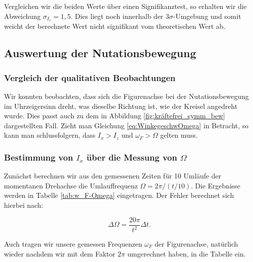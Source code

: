 \documentclass{article}
\begin{document}
Vergleichen wir die beiden Werte über einen Signifikanztest, so erhalten wir die Abweichung $\sigma_{I_z} = 1,5$. Dies liegt noch innerhalb der $3\sigma$-Umgebung und somit weicht der berechnete Wert nicht signifikant vom theoretischen Wert ab.


\newpage

\subsection{Auswertung der Nutationsbewegung}

\subsubsection{Vergleich der qualitativen Beobachtungen}

Wir konnten beobachten, dass sich die Figurenachse bei der Nutationsbewegung im Uhrzeigersinn dreht, was dieselbe Richtung ist, wie der Kreisel angedreht wurde. Dies passt auch zu dem in Abbildung \ref{fig:kräftefrei_symm_bew} dargestellten Fall. Zieht man Gleichung \ref{eq:WinkegeschwOmega} in Betracht, so kann man schlussfolgern, dass $I_x > I_z$ und $\omega_F > \Omega$ gelten muss.

\subsubsection{Bestimmung von $I_x$ über die Messung von $\Omega$}

Zunächst berechnen wir aus den gemessenen Zeiten für 10 Umläufe der momentanen Drehachse die Umlauffrequenz $\Omega = 2 \pi / (t/10)$. Die Ergebnisse werden in Tabelle \ref{tab:w_F-Omega} eingetragen. Der Fehler berechnet sich hierbei nach:

\begin{equation}
    \Delta \Omega = \frac{20 \pi}{t^2} \Delta t. 
\end{equation}

Auch tragen wir unsere gemessen Frequenzen $\omega_F$ der Figurenachse, natürlich wieder nachdem wir mit dem Faktor $2 \pi$ umgerechnet haben, in die Tabelle ein.

\phantom{.}
\end{document}
